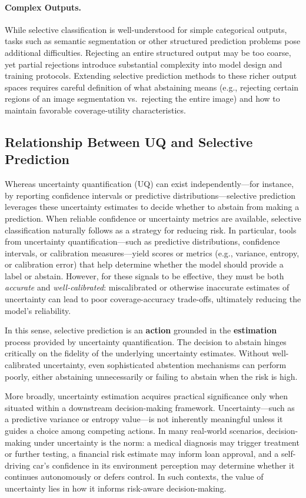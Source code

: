 \paragraph{Complex Outputs.}
While selective classification is well-understood for simple categorical outputs, tasks such as semantic segmentation or other structured prediction problems pose additional difficulties. Rejecting an entire structured output may be too coarse, yet partial rejections introduce substantial complexity into model design and training protocols. Extending selective prediction methods to these richer output spaces requires careful definition of what abstaining means (e.g., rejecting certain regions of an image segmentation vs.\ rejecting the entire image) and how to maintain favorable coverage-utility characteristics.


\subsection{Relationship Between UQ and Selective Prediction}

Whereas uncertainty quantification (UQ) can exist independently—for instance, by reporting confidence intervals or predictive distributions—selective prediction leverages these uncertainty estimates to decide whether to abstain from making a prediction. When reliable confidence or uncertainty metrics are available, selective classification naturally follows as a strategy for reducing risk. In particular, tools from uncertainty quantification—such as predictive distributions, confidence intervals, or calibration measures—yield scores or metrics (e.g., variance, entropy, or calibration error) that help determine whether the model should provide a label or abstain. However, for these signals to be effective, they must be both \emph{accurate} and \emph{well-calibrated}: miscalibrated or otherwise inaccurate estimates of uncertainty can lead to poor coverage-accuracy trade-offs, ultimately reducing the model’s reliability.

In this sense, selective prediction is an \textbf{action} grounded in the \textbf{estimation} process provided by uncertainty quantification. The decision to abstain hinges critically on the fidelity of the underlying uncertainty estimates. Without well-calibrated uncertainty, even sophisticated abstention mechanisms can perform poorly, either abstaining unnecessarily or failing to abstain when the risk is high.

More broadly, uncertainty estimation acquires practical significance only when situated within a downstream decision-making framework. Uncertainty—such as a predictive variance or entropy value—is not inherently meaningful unless it guides a choice among competing actions. In many real-world scenarios, decision-making under uncertainty is the norm: a medical diagnosis may trigger treatment or further testing, a financial risk estimate may inform loan approval, and a self-driving car’s confidence in its environment perception may determine whether it continues autonomously or defers control. In such contexts, the value of uncertainty lies in how it informs risk-aware decision-making.

